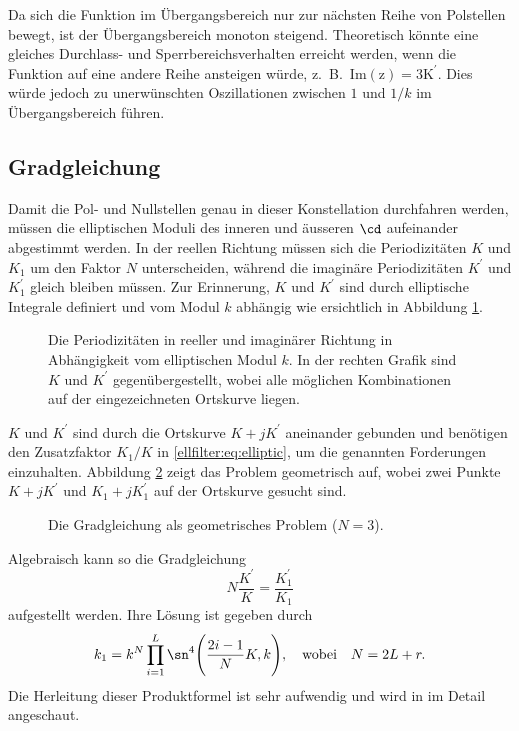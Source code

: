 Da sich die Funktion im Übergangsbereich nur zur nächsten Reihe von Polstellen bewegt, ist der Übergangsbereich monoton steigend.
Theoretisch könnte eine gleiches Durchlass- und Sperrbereichsverhalten erreicht werden, wenn die Funktion auf eine andere Reihe ansteigen würde, z.~B.~$\mathrm{Im(z) = 3K^\prime}$.
Dies würde jedoch zu unerwünschten Oszillationen zwischen $1$ und $1/k$ im Übergangsbereich führen.

\subsection{Gradgleichung}

Damit die Pol- und Nullstellen genau in dieser Konstellation durchfahren werden, müssen die elliptischen Moduli des inneren und äusseren $\cd$ aufeinander abgestimmt werden.
In der reellen Richtung müssen sich die Periodizitäten $K$ und $K_1$ um den Faktor $N$ unterscheiden, während die imaginäre Periodizitäten $K^\prime$ und $K^\prime_1$ gleich bleiben müssen.
Zur Erinnerung, $K$ und $K^\prime$ sind durch elliptische Integrale definiert und vom Modul $k$ abhängig wie ersichtlich in Abbildung \ref{ellfilter:fig:kprime}.
\begin{figure}
    \centering
    
    \caption{
        Die Periodizitäten in reeller und imaginärer Richtung in Abhängigkeit vom elliptischen Modul $k$.
        In der rechten Grafik sind $K$ und $K^\prime$ gegenübergestellt, wobei alle möglichen Kombinationen auf der eingezeichneten Ortskurve liegen.
    }
    \label{ellfilter:fig:kprime}
\end{figure}
$K$ und $K^\prime$ sind durch die Ortskurve $K + jK^\prime$ aneinander gebunden und benötigen den Zusatzfaktor $K_1/K$ in \eqref{ellfilter:eq:elliptic}, um die genannten Forderungen einzuhalten.
Abbildung \ref{ellfilter:fig:degree_eq} zeigt das Problem geometrisch auf, wobei zwei Punkte $K+jK^\prime$ und $K_1+jK_1^\prime$ auf der Ortskurve gesucht sind.
\begin{figure}
    \centering
    
    \caption{Die Gradgleichung als geometrisches Problem ($N=3$).}
    \label{ellfilter:fig:degree_eq}
\end{figure}
Algebraisch kann so die Gradgleichung
\begin{equation}
    N \frac{K^\prime}{K} = \frac{K^\prime_1}{K_1}
\end{equation}
aufgestellt werden. Ihre Lösung ist gegeben durch
\begin{equation}\label{ellfilter:eq:degeqsol}
k_1 = k^N \prod_{i=1}^L \sn^4 \Bigg( \frac{2i - 1}{N} K, k \Bigg),
\quad \text{wobei} \quad
N = 2L+r.
\end{equation}
Die Herleitung dieser Produktformel ist sehr aufwendig und wird in \cite{ellfilter:bib:orfanidis} im Detail angeschaut.

